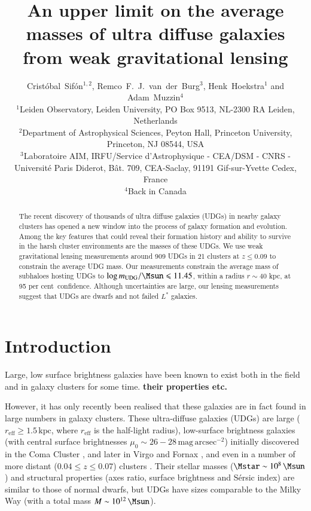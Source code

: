 \documentclass[usenatbib,fleqn]{mnras}
\title[Weak lensing masses of UDGs]{An upper limit on the average masses of ultra diffuse galaxies from weak gravitational lensing}
\author[C.\ Sif\'on, R.\ F.\ J.\ van der Burg, H.\ Hoekstra \& A.\ Muzzin]
  {
      Crist\'obal~Sif\'on$^{1,2}$, %
      Remco~F.~J.~van~der~Burg$^3$,
      Henk~Hoekstra$^1$
      and
      Adam~Muzzin$^4$%
\\
      $^1$Leiden Observatory, Leiden University, PO Box 9513, NL-2300 RA Leiden, Netherlands\\
      $^2$Department of Astrophysical Sciences, Peyton Hall, Princeton University, Princeton, NJ 08544, USA\\
      $^3$Laboratoire AIM, IRFU/Service d'Astrophysique - CEA/DSM - CNRS - Universit\'e Paris Diderot, B\^at. 709, CEA-Saclay, 91191 Gif-sur-Yvette Cedex, France\\
      $^4$Back in Canada
  }
\def\percent{ per cent}
\def\reff{r_\mathrm{eff}}
\begin{document}
\label{firstpage}
\pagerange{\pageref{firstpage}--\pageref{lastpage}}

\maketitle

\begin{abstract}
        The recent discovery of thousands of ultra diffuse galaxies (UDGs) in nearby galaxy clusters has opened a new window into the process of galaxy formation and evolution. Among the key features that could reveal their formation history and ability to survive in the harsh cluster environments are the masses of these UDGs. We use weak gravitational lensing measurements around 909 UDGs in 21 clusters at $z\leq0.09$ to constrain the average UDG mass. Our measurements constrain the average mass of subhaloes hosting UDGs to $\log m_{\rm UDG}/\Msun\leq11.45$, within a radius $r\sim40$ kpc, at 95\percent\ confidence. Although uncertainties are large, our lensing measurements suggest that UDGs are dwarfs and not failed $L^*$ galaxies.
\end{abstract}

\section{Introduction}
\label{s:intro}

Large, low surface brightness galaxies have been known to exist both in the field \citep{} and in galaxy clusters \citep{} for some time. \textbf{their properties etc.}

However, it has only recently been realised that these galaxies are in fact found in large numbers in galaxy clusters. These ultra-diffuse galaxies (UDGs) are large ($\reff\geq1.5\,\mathrm{kpc}$, where $\reff$ is the half-light radius), low-surface brightness galaxies (with central surface brightnesses $\mu_0\sim26-28\,\mathrm{mag\,arcsec^{-2}}$) initially discovered in the Coma Cluster \citep{vandokkum15,koda15,yagi16}, and later in Virgo \citep{mihos15} and Fornax \citep{munoz15}, and even in a number of more distant ($0.04\leq z \leq0.07$) clusters \citep{vdburg16}. Their stellar masses ($\Mstar\sim10^8\,\Msun$) and structural properties (axes ratio, surface brightness and S\'ersic index) are similar to those of normal dwarfs, but UDGs have sizes comparable to the Milky Way (with a total mass $M\sim10^{12}\,\Msun$).
\end{document}
